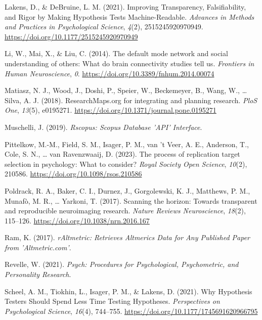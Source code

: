 \documentclass[
  man,floatsintext]{apa6}
\newlength{\cslhangindent}
\newlength{\cslentryspacingunit} %
\newenvironment{CSLReferences}[2] %
 {%
  \setlength{\parindent}{0pt}
  \ifodd #1
  \let\oldpar\par
  \def\par{\hangindent=\cslhangindent\oldpar}
  \fi
  \setlength{\parskip}{#2\cslentryspacingunit}
 }%
 {}
\begin{document}
\begin{CSLReferences}{1}{0}
\leavevmode{}%
Lakens, D., \& DeBruine, L. M. (2021). Improving {Transparency}, {Falsifiability}, and {Rigor} by {Making Hypothesis Tests Machine-Readable}. \emph{Advances in Methods and Practices in Psychological Science}, \emph{4}(2), 2515245920970949. \url{https://doi.org/10.1177/2515245920970949}

\leavevmode{}%
Li, W., Mai, X., \& Liu, C. (2014). The default mode network and social understanding of others: What do brain connectivity studies tell us. \emph{Frontiers in Human Neuroscience}, \emph{0}. \url{https://doi.org/10.3389/fnhum.2014.00074}

\leavevmode{}%
Matiasz, N. J., Wood, J., Doshi, P., Speier, W., Beckemeyer, B., Wang, W., \ldots{} Silva, A. J. (2018). {ResearchMaps}.org for integrating and planning research. \emph{PloS One}, \emph{13}(5), e0195271. \url{https://doi.org/10.1371/journal.pone.0195271}

\leavevmode{}%
Muschelli, J. (2019). \emph{Rscopus: {Scopus Database} '{API}' {Interface}}.

\leavevmode{}%
Pittelkow, M.-M., Field, S. M., Isager, P. M., van 't Veer, A. E., Anderson, T., Cole, S. N., \ldots{} van Ravenzwaaij, D. (2023). The process of replication target selection in psychology: What to consider? \emph{Royal Society Open Science}, \emph{10}(2), 210586. \url{https://doi.org/10.1098/rsos.210586}

\leavevmode{}%
Poldrack, R. A., Baker, C. I., Durnez, J., Gorgolewski, K. J., Matthews, P. M., Munafò, M. R., \ldots{} Yarkoni, T. (2017). Scanning the horizon: Towards transparent and reproducible neuroimaging research. \emph{Nature Reviews Neuroscience}, \emph{18}(2), 115--126. \url{https://doi.org/10.1038/nrn.2016.167}

\leavevmode{}%
Ram, K. (2017). \emph{{rAltmetric}: {Retrieves Altmerics Data} for {Any Published Paper} from '{Altmetric}.com'}.

\leavevmode{}%
Revelle, W. (2021). \emph{Psych: {Procedures} for {Psychological}, {Psychometric}, and {Personality Research}}.

\leavevmode{}%
Scheel, A. M., Tiokhin, L., Isager, P. M., \& Lakens, D. (2021). Why {Hypothesis Testers Should Spend Less Time Testing Hypotheses}. \emph{Perspectives on Psychological Science}, \emph{16}(4), 744--755. \url{https://doi.org/10.1177/1745691620966795}


\end{CSLReferences}
\end{document}
